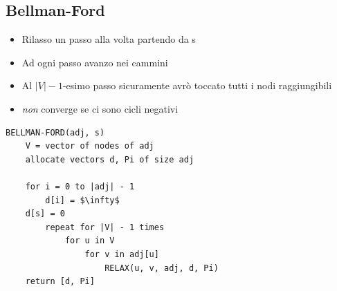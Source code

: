 \documentclass[10pt,a4paper]{article}
\begin{document}
\begin{multicols*}{2}
\subsection*{Bellman-Ford}
\begin{itemize}
    \item Rilasso un passo alla volta partendo da s
    \item Ad ogni passo avanzo nei cammini
    \item Al $|V| - 1$-esimo passo sicuramente avrò toccato tutti i nodi raggiungibili
    \item \emph{non} converge se ci sono cicli negativi
\end{itemize}
\begin{lstlisting}
BELLMAN-FORD(adj, s)
    V = vector of nodes of adj
    allocate vectors d, Pi of size adj

    for i = 0 to |adj| - 1
        d[i] = $\infty$
    d[s] = 0
        repeat for |V| - 1 times
            for u in V
                for v in adj[u]
                    RELAX(u, v, adj, d, Pi)
    return [d, Pi]
\end{lstlisting}
\end{multicols*}
\pagebreak
\end{document}

